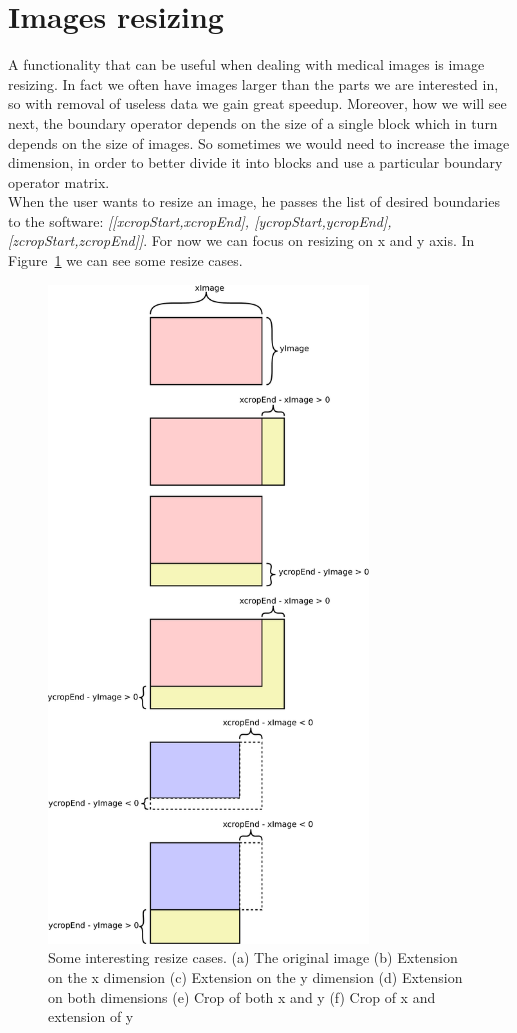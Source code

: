\section{Images resizing}\label{sec32:ImagesResizing}

A functionality that can be useful when dealing with medical images is image resizing. In fact we often have images larger than the parts we are interested in, so with removal of useless data we gain great speedup. Moreover, how we will see next, the boundary operator depends on the size of a single block which in turn depends on the size of images. So sometimes we would need to increase the image dimension, in order to better divide it into blocks and use a particular boundary operator matrix.\\

When the user wants to resize an image, he passes the list of desired boundaries to the software: \textit{[[xcropStart,xcropEnd], [ycropStart,ycropEnd], [zcropStart,zcropEnd]]}. For now we can focus on resizing on x and y axis. In Figure~\ref{fig:resizeCases} we can see some resize cases.

\begin{figure}[htbp] %
   \centering
   \includegraphics[width=8.5cm]{images/resizeCases.pdf} \hfill
   \caption[Some interesting resize cases]{Some interesting resize cases. (a) The original image (b) Extension on the x dimension (c) Extension on the y dimension (d) Extension on both dimensions (e) Crop of both x and y (f) Crop of x and extension of y}
   \label{fig:resizeCases}
\end{figure}

